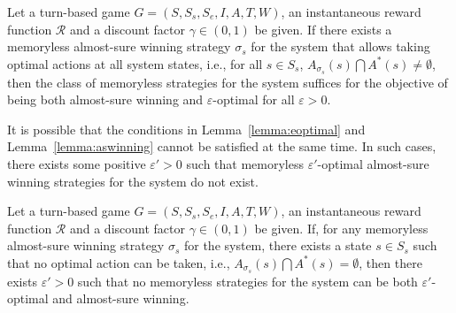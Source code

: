 \documentclass[runningheads,a4paper]{llncs}
\begin{document}
\begin{theorem}
Let a turn-based game $G = (S, S_s, S_e, I, A, T, W)$, an instantaneous reward function $\mathcal{R}$ and a discount factor $\gamma \in (0,1)$ be given. If there exists a memoryless almost-sure winning strategy $\sigma_s$ for the system that allows taking optimal actions at all system states, 
i.e., for all $s \in S_s$, $A_{\sigma_s}(s) \bigcap A^*(s) \not= \emptyset$, then the class of memoryless strategies for the system suffices for the objective of being both almost-sure winning and $\varepsilon$-optimal for all $\varepsilon > 0$.
\label{thm:arbitrarye}
\end{theorem}

It is possible that the conditions in Lemma~\ref{lemma:eoptimal} and Lemma~\ref{lemma:aswinning} cannot be satisfied at the same time. In such cases, there exists some positive $\varepsilon' > 0$ such that memoryless $\varepsilon'$-optimal almost-sure winning strategies for the system do not exist. 

\begin{lemma}
Let a turn-based game $G = (S, S_s, S_e, I, A, T, W)$, an instantaneous reward function $\mathcal{R}$ and a discount factor $\gamma \in (0,1)$ be given. If, for any memoryless almost-sure winning strategy $\sigma_s$ for the system, there exists a state $s \in S_s$ such that no optimal action can be taken, i.e., $A_{\sigma_s}(s) \bigcap A^*(s) = \emptyset$, then there exists $\varepsilon' > 0$ such that no memoryless strategies for the system can be both $\varepsilon'$-optimal and almost-sure winning.
\label{lemma:epsilonno}
\end{lemma}
\end{document}
